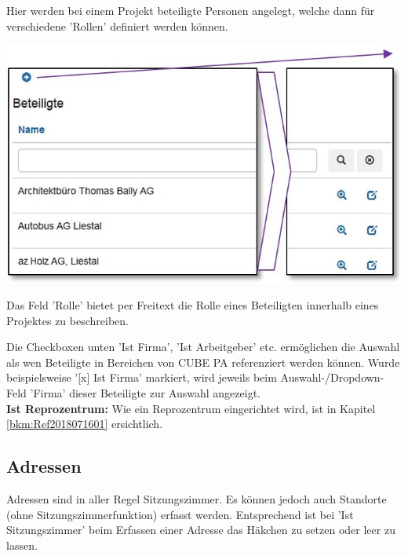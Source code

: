 Hier werden bei einem Projekt beteiligte Personen angelegt, welche dann für verschiedene 'Rollen' definiert werden können.

\begin{center}
\hspace{-15pt}   
\includegraphics[width=.9\linewidth]{../chapters/13_Konfigurationen/pictures/13-4_Beteiligte.jpg}
\end{center}

Das Feld 'Rolle' bietet per Freitext die Rolle eines Beteiligten innerhalb eines Projektes zu beschreiben. 

\vspace{\baselineskip}

Die Checkboxen unten 'Ist Firma', 'Ist Arbeitgeber' etc. ermöglichen die Auswahl als wen Beteiligte in Bereichen von CUBE PA referenziert werden können. Wurde beispielsweise '[x] Ist Firma' markiert, wird jeweils beim Auswahl-/Dropdown-Feld 'Firma' dieser Beteiligte zur Auswahl angezeigt.\\

\textbf{Ist Reprozentrum:} Wie ein Reprozentrum eingerichtet wird, ist in Kapitel \ref{bkm:Ref2018071601} ersichtlich.

\vspace{\baselineskip}
\vspace{\baselineskip}
\vspace{\baselineskip}

\pagebreak
\subsection{Adressen}

Adressen sind in aller Regel Sitzungszimmer. Es können jedoch auch Standorte (ohne Sitzungszimmerfunktion) erfasst werden. Entsprechend ist bei 'Ist Sitzungszimmer' beim Erfassen einer Adresse das Häkchen zu setzen oder leer zu lassen.

